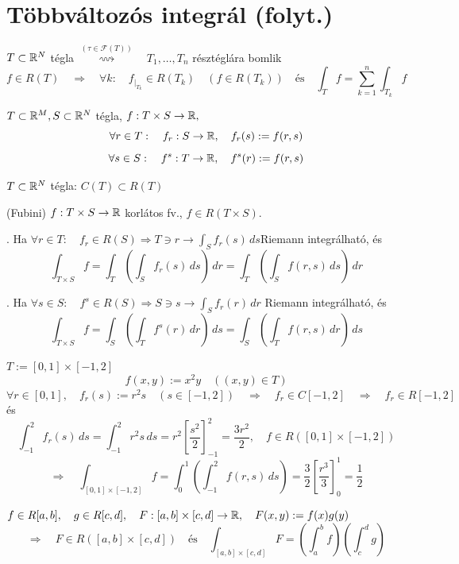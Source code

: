 \documentclass[a4paper,11.5pt]{article}
\begin{document}
	\section{Többváltozós integrál (folyt.)}
	\begin{theorem}
		$T\subset \mathbb{R}^N$ tégla $\overset{(\tau\in\mathcal{F}(T))}{\rightsquigarrow}\quad T_1,\ldots,T_n$ résztéglára bomlik
		\[f\in R(T)\quad \Rightarrow\quad \forall k:\quad f_{\big|_{T_k}}\in R(T_k)\quad (f\in R(T_k))\quad \text{és}\quad  \int_{T}f=\sum_{k=1}^n\int_{T_k}f \]
	\end{theorem}
	\begin{definition}
		$T\subset\mathbb{R}^M, S\subset\mathbb{R}^N$ tégla, $f:T\times S\to\mathbb{R},$
		\[ \forall r\in T:\quad f_r:S\to\mathbb{R},\quad f_r(s):=f(r,s) \]
		\[ \forall s\in S:\quad f^s:T\to\mathbb{R},\quad f^s(r):=f(r,s) \]
	\end{definition}
	\begin{theorem}
		$T\subset \mathbb{R}^N$ tégla: $C(T)\subset R(T)$
	\end{theorem}
	\begin{theorem}
		(Fubini) $f: T\times S\to\mathbb{R}$ korlátos fv., $f\in R(T\times S)$. 
		
		. Ha $\forall r\in T:\quad f_r\in R(S)\Rightarrow T\ni r\to\int_Sf_r(s)\,ds$\quad Riemann integrálható, és
		\[ \int_{T\times S}f=\int_T\left(\int_Sf_r(s)\,ds\right)\,dr=\int_T\left(\int_Sf(r,s)\,ds\right)\,dr \]
		
		. Ha $\forall s\in S:\quad f^s\in R(S)\Rightarrow S\ni s\to\int_Sf_r(r)\,dr$ Riemann integrálható, és
		\[ \int_{T\times S}f=\int_S\left(\int_Tf^s(r)\,dr\right)\,ds=\int_S\left(\int_Tf(r,s)\,dr\right)\,ds \]
		
	\end{theorem}
	\begin{example}
		$T:=[0,1]\times[-1,2]$
		\[ f(x,y):=x^2y\quad ((x,y)\in T)\]
		$\forall r\in[0,1],\quad f_r(s):=r^2s\quad (s\in[-1,2])\quad \Rightarrow\quad f_r\in C[-1,2]\quad \Rightarrow\quad f_r\in R[-1,2]$ \quad és \[\int_{-1}^{2}f_r(s)\,ds=\int_{-1}^{2}r^2s\,ds=r^2\left[\frac{s^2}{2}\right]_{-1}^2=\frac{3r^2}{2}, \quad f\in R([0,1]\times[-1,2])\]
		\[ \Rightarrow\quad \int_{[0,1]\times[-1,2]}^{}f=\int_{0}^{1}\left(\int_{-1}^{2}f(r,s)\,ds\right)=\frac{3}{2}\left[\frac{r^3}{3}\right]^1_0=\frac{1}{2} \]
	\end{example}
	\begin{theorem}
		$f\in R[a,b],\quad g\in R[c,d],\quad F:[a,b]\times[c,d]\to\mathbb{R},\quad F(x,y):=f(x)g(y)$
		\[ \Rightarrow\quad F\in R([a,b]\times[c,d])\quad \text{és}\quad \int_{[a,b]\times[c,d]}^{}F=\left(\int_{a}^{b}f\right)\left(\int_{c}^{d}g\right) \]
	\end{theorem}
\end{document}
